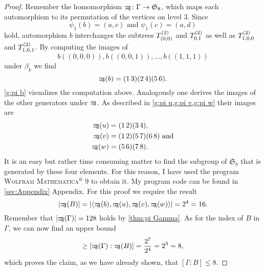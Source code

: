 \begin{proof}
Remember the homomorphism $\varpi\hspace{-0.4em}_3\colon\Gamma\to\mathfrak{S}_8$, which maps each automorphism to its permutation of the vertices on level 3. Since
\begin{equation*}
\psi_1(b)=(a,c)\text{ and }\psi_1(c)=(a,d)
\end{equation*}
hold, automorphism $b$ interchanges the subtrees $T^{(2)}_{(0,0)}$ and $T^{(2)}_{0,1}$ as well as $T^{(2)}_{1,0,0}$ and $T^{(2)}_{1,0,1}$. By computing the images of 
\begin{equation*}
b((0,0,0)),b((0,0,1)),\ldots,b((1,1,1))
\end{equation*}
 under $\beta_k$ we find
\begin{equation*}
\varpi\hspace{-0.4em}_3(b)=(1\,3)(2\,4)(5\,6).
\end{equation*}
\cref{g:pi b} visualizes the computation above. Analogously one derives the images of the other generators under $\varpi\hspace{-0.4em}_3$. As described in \cref{g:pi u,g:pi v,g:pi w} their images are
\begin{align*}
\varpi\hspace{-0.4em}_3(u)	&=(1\,2)(3\,4),\\
\varpi\hspace{-0.4em}_3(v)	&=(1\,2)(5\,7)(6\,8)\text{ and}\\
\varpi\hspace{-0.4em}_3(w)	&=(5\,6)(7\,8).
\end{align*}
It is an easy but rather time consuming matter to find the subgroup of $\mathfrak{S}_8$ that is generated by these four elements. For this reason, I have used the program \textsc{Wolfram Mathematica$^\circledR$ 9} to obtain it. My program code can be found in \ref{sec:Appendix} Appendix. For this proof we require the result
\begin{equation*}
\lvert\varpi\hspace{-0.4em}_3(B)\rvert=\lvert\langle\varpi\hspace{-0.4em}_3(b),\varpi\hspace{-0.4em}_3(u),\varpi\hspace{-0.4em}_3(v),\varpi\hspace{-0.4em}_3(w)\rangle\rvert=2^4=16.
\end{equation*}
Remember that $\lvert \varpi\hspace{-0.4em}_3(\Gamma)\rvert=128$ holds by \cref{thm:pi Gamma}. As for the index of $B$ in $\Gamma$, we can now find an upper bound
\begin{equation*}
[\Gamma:B]\geq [\varpikern_3(\Gamma):\varpikern_3(B)]=\frac{2^7}{2^4}=2^3=8,
\end{equation*}
which proves the claim, as we have already shown, that $[\Gamma:B]\leq 8$.
\end{proof}


